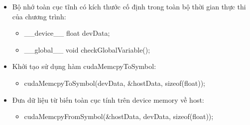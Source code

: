 \documentclass[14pt, a4paper]{article}
\numberwithin{equation}{section}
\numberwithin{figure}{section}
\numberwithin{dl}{section}
\numberwithin{md}{section}
\numberwithin{bd}{section}
\numberwithin{dn}{section}
\numberwithin{hq}{section}
\begin{document}
\begin{table}[H]
    \centering
\end{table}

\begin{itemize}
    \item Bộ nhớ toàn cục tĩnh có kích thước cố định trong toàn bộ thời gian thực thi của chương trình:
    \begin{itemize}
        \item \_\_device\_\_ float devData;
        \item \_\_global\_\_ void checkGlobalVariable();
    \end{itemize}
    \item Khởi tạo sử dụng hàm cudaMemcpyToSymbol:
    \begin{itemize}
        \item cudaMemcpyToSymbol(devData, \&hostData, sizeof(float));
    \end{itemize}
    \item Đưa dữ liệu từ biến toàn cục tính trên device memory về host:
    \begin{itemize}
        \item cudaMemcpyFromSymbol(\&hostData, devData, sizeof(float));
    \end{itemize}
\end{itemize}
\end{document}
